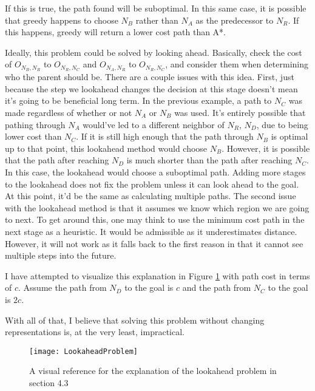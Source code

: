 If this is true, the path found will be suboptimal. In this same case, it is possible that greedy happens to choose $N_B$ rather than $N_A$ as the predecessor to $N_R$. If this happens, greedy will return a lower cost path than A*.

Ideally, this problem could be solved by looking ahead. Basically, check the cost of $O_{N_B, N_R}$ to $O_{N_R, N_C}$ and $O_{N_A, N_R}$ to $O_{N_R, N_C}$, and consider them when determining who the parent should be. There are a couple issues with this idea. First, just because the step we lookahead changes the decision at this stage doesn't mean it's going to be beneficial long term. In the previous example, a path to $N_C$ was made regardless of whether or not $N_A$ or $N_B$ was used. It's entirely possible that pathing through $N_A$ would've led to a different neighbor of $N_R$, $N_D$, due to being lower cost than $N_C$. If it is still high enough that the path through $N_B$ is optimal up to that point, this lookahead method would choose $N_B$. However, it is possible that the path after reaching $N_D$ is much shorter than the path after reaching $N_C$. In this case, the lookahead would choose a suboptimal path. Adding more stages to the lookahead does not fix the problem unless it can look ahead to the goal. At this point, it'd be the same as calculating multiple paths. The second issue with the lookahead method is that it assumes we know which region we are going to next. To get around this, one may think to use the minimum cost path in the next stage as a heuristic. It would be admissible as it underestimates distance. However, it will not work as it falls back to the first reason in that it cannot see multiple steps into the future. 

I have attempted to visualize this explanation in Figure \ref{LookaheadRef} with path cost in terms of $c$. Assume the path from $N_D$ to the goal is $c$ and the path from $N_C$ to the goal is $2c$.


With all of that, I believe that solving this problem without changing representations is, at the very least, impractical. 

\begin{figure}
\centering
\texttt{[image: LookaheadProblem]}
\caption{A visual reference for the explanation of the lookahead problem in section 4.3}
\label{LookaheadRef}
\end{figure}
